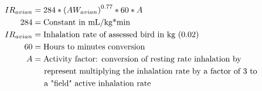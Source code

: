 \documentclass[fleqn, oneside, 11pt]{article}%
\begin{document}
\begin{preview}
\begin{align*}%
IR_{avian} & = 284*\left(AW_{avian}\right)^{0.77}*60*A \nonumber \\
284 & =  \text{Constant in mL/kg*min} \nonumber \\
IR_{avian} & =  \text{Inhalation rate of assessed bird in kg (0.02)} \nonumber \\
60 & =  \text{Hours to minutes conversion} \nonumber \\
A & =  \text{Activity factor: conversion of resting rate inhalation by} \nonumber \\
&    \hspace{.15in} \text{ represent multiplying the inhalation rate by a factor of 3 to } \nonumber\\
&    \hspace{.15in} \text{ a "field" active inhalation rate} \nonumber\\
\end{align*} 
\end{preview}
\end{document}
